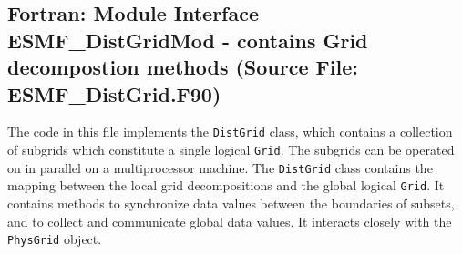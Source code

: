  
\parskip        0pt
\parindent      0pt
\baselineskip  11pt
 
\def\bv{\begin{verbatim}}
\def\ev{\end{verbatim}}
\def\be{\begin{equation}}
\def\ee{\end{equation}}
\def\bea{\begin{eqnarray}}
\def\eea{\end{eqnarray}}
\def\bi{\begin{itemize}}
\def\ei{\end{itemize}}
\def\bn{\begin{enumerate}}
\def\en{\end{enumerate}}
\def\bd{\begin{description}}
\def\ed{\end{description}}
\def\({\left (}
\def\){\right )}
\def\[{\left [}
\def\]{\right ]}
\def\<{\left  \langle}
\def\>{\right \rangle}
\def\cI{{\cal I}}
\def\diag{\mathop{\rm diag}}
\def\tr{\mathop{\rm tr}}


 
\subsection{Fortran:  Module Interface ESMF\_DistGridMod - contains Grid decompostion methods (Source File: ESMF\_DistGrid.F90)}


  
  
   The code in this file implements the {\tt DistGrid} class, which contains a
   collection of subgrids which constitute a single logical {\tt Grid}. The
   subgrids can be operated on in parallel on a multiprocessor machine. The
   {\tt DistGrid} class contains the mapping between the local grid 
   decompositions and the global logical {\tt Grid}. It contains methods to
   synchronize data values between the boundaries of subsets, and to collect
   and communicate global data values. It interacts closely with the
   {\tt PhysGrid} object.
  
